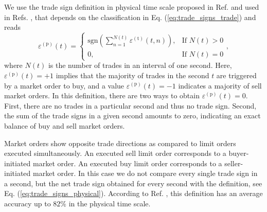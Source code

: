 We use the trade sign definition in physical time scale proposed in Ref.
\cite{Wang_2016_cross} and used in Refs.
\cite{Wang_2016_avg,Wang_2017}, that depends on the classification in
Eq. (\ref{eq:trade_signs_trade}) and reads
\begin{equation}\label{eq:trade_signs_physical}
    \varepsilon^{\left(\textrm{p}\right)}\left(t\right)=\left\{
    \begin{array}{cc}
    \text{sgn}\left(\sum_{n=1}^{N\left(t\right)}
    \varepsilon^{\left(\textrm{t}\right)} \left(t,n\right)\right),
    & \text{If }N \left(t\right)>0\\
    0, & \text{If }N\left(t\right)=0
    \end{array}\right. ,
\end{equation}
where $N \left(t \right)$ is the number of trades in an interval of one second.
Here, $\varepsilon^{\left(\textrm{p}\right)}\left( t \right) = +1$ implies that
the majority of trades in the second $t$ are triggered by a market order to buy,
and a value $\varepsilon^{\left(\textrm{p}\right)}\left( t \right) = -1$
indicates a majority of sell market orders. In this definition, there are two
ways to obtain $\varepsilon^{\left(\textrm{p}\right)}\left( t \right) = 0$.
First, there are no trades in a particular second and thus no trade sign.
Second, the sum of the trade signs in a given second amounts to zero,
indicating an exact balance of buy and sell market orders.

Market orders show opposite trade directions as compared to limit orders
executed simultaneously. An executed sell limit order corresponds to a
buyer-initiated market order. An executed buy limit order corresponds to a
seller-initiated market order. In this case we do not compare every single
trade sign in a second, but the net trade sign obtained for every second with
the definition, see Eq. (\ref{eq:trade_signs_physical}). According to Ref.
\cite{Wang_2016_cross}, this definition has an average accuracy up to $82\%$ in
the physical time scale.
